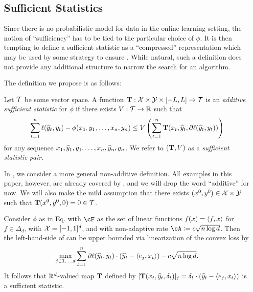 \subsection{Sufficient Statistics}

Since there is no probabilistic model for data in the online learning setting, the notion of ``sufficiency'' has to be tied to the particular choice of $\phi$. It is then tempting to define a sufficient statistic as a ``compressed'' representation which may be used by some strategy to ensure . While natural, such a definition does not provide any additional structure to narrow the search for an algorithm.

The definition we propose is as follows:
\begin{definition}
	\label{def:sufficiency}
	Let $\mathcal{T}$ be some vector space. A function $\mathbf{T}: \mathcal{X} \times \mathcal{Y} \times [-L,L] \to \mathcal{T}$ is an \emph{additive sufficient statistic} for $\phi$ if there exists $V: \mathcal{T} \to {\mathbb R}$ such that
\begin{align}
	\label{eq:suffiency_def}
\sum_{t=1}^n {\ell}({\widehat{y}}_t,y_t)- \phi(x_1,y_1,\ldots,x_n,y_n) \le  V\left(\sum_{t=1}^n \mathbf{T}(x_t,{\widehat{y}}_t,\partial {\ell}({\widehat{y}}_t,y_t))\right) 
\end{align}
for any sequence $x_1,{\widehat{y}}_1,y_1, \ldots, x_n,{\widehat{y}}_n,y_n$. We refer to $(\mathbf{T}, V)$ as a \emph{sufficient statistic pair}.
\end{definition}
In , we consider a more general non-additive definition. All examples in this paper, however, are already covered by , and we will drop the word ``additive'' for now. We will also make the mild assumption that there exists $(x^0,y^0)\in\mathcal{X}\times\mathcal{Y}$ such that $\mathbf{T}(x^0,y^0,0)=0\in \mathcal{T}$.
\begin{example}
	\label{ex:experts}
	Consider $\phi$ as in Eq.  with $\cF$ as the set of linear functions $f(x)=\left\langle f,x \right\rangle$ for $f\in\Delta_d$, with $\mathcal{X}=[-1,1]^d$, and with non-adaptive rate $\cA \ldef c\sqrt{n\log d}$. Then the left-hand-side of  can be upper bounded via linearization of the convex loss by 
	$$\max_{j \in 1,\ldots,d}\sum_{t=1}^n \partial{\ell}({\widehat{y}}_t,y_t) \cdot ({\widehat{y}}_t-\left\langle e_j,x_t \right\rangle) - c\sqrt{n\log d}.$$
	It follows that ${\mathbb R}^d$-valued map $\mathbf{T}$ defined by $[\mathbf{T}(x_t,{\widehat{y}}_t,\delta_t)]_j = \delta_t\cdot ({\widehat{y}}_t-\left\langle e_j,x_t \right\rangle)$ is a sufficient statistic.
\end{example}

